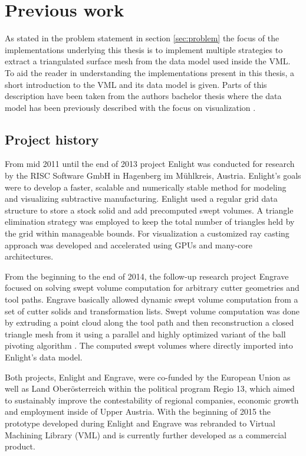 \chapter{Previous work}
\label{ch:previous_work}

As stated in the problem statement in section \ref{sec:problem} the focus of the implementations underlying this thesis is to implement multiple strategies to extract a triangulated surface mesh from the data model used inside the VML.
To aid the reader in understanding the implementations present in this thesis, a short introduction to the VML and its data model is given.
Parts of this description have been taken from the authors bachelor thesis where the data model has been previously described with the focus on visualization \cite{bachelor}.

\section{Project history}
\label{sec:project_history}

From mid 2011 until the end of 2013 project Enlight was conducted for research by the RISC Software GmbH in Hagenberg im M\"uhlkreis, Austria.
Enlight's goals were to develop a faster, scalable and numerically stable method for modeling and visualizing subtractive manufacturing.
Enlight used a regular grid data structure to store a stock solid and add precomputed swept volumes.
A triangle elimination strategy was employed to keep the total number of triangles held by the grid within manageable bounds.
For visualization a customized ray casting approach was developed \cite{enlight} and accelerated using GPUs and many-core architectures.

From the beginning to the end of 2014, the follow-up research project Engrave focused on solving swept volume computation for arbitrary cutter geometries and tool paths.
Engrave basically allowed dynamic swept volume computation from a set of cutter solids and transformation lists.
Swept volume computation was done by extruding a point cloud along the tool path and then reconstruction a closed triangle mesh from it using a parallel and highly optimized variant of the ball pivoting algorithm 
\cite{engrave}.
The computed swept volumes where directly imported into Enlight's data model.

Both projects, Enlight and Engrave, were co-funded by the European Union as well as Land Ober\"osterreich within the political program Regio 13, which aimed to sustainably improve the contestability of regional companies, economic growth and employment inside of Upper Austria.
%
With the beginning of 2015 the prototype developed during Enlight and Engrave was rebranded to Virtual Machining Library (VML) and is currently further developed as a commercial product.

